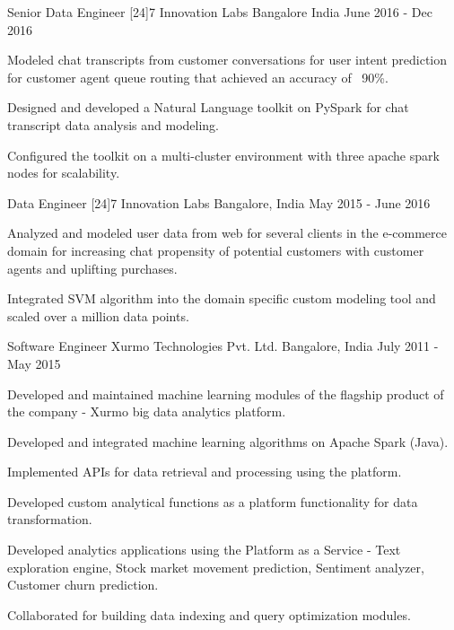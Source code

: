 \begin{cventries}
  \cventry
    {Senior Data Engineer}
    {[24]7 Innovation Labs}
    {Bangalore India}
    {June 2016 - Dec 2016}
    {
      \begin{cvitems}
        \item {Modeled chat transcripts from customer conversations for user intent prediction for customer agent queue routing that achieved an accuracy of ~90\%.}
        \item {Designed and developed a Natural Language toolkit on PySpark for chat transcript data analysis and modeling.}
        \item {Configured the toolkit on a multi-cluster environment with three apache spark nodes for scalability.}
      \end{cvitems}
    }
  \cventry
    {Data Engineer}
    {[24]7 Innovation Labs}
    {Bangalore, India}
    {May 2015 - June 2016}
    {
      \begin{cvitems}
        \item {Analyzed and modeled user data from web for several clients in the e-commerce domain for increasing chat propensity of potential customers with customer agents and uplifting purchases.}
        \item {Integrated SVM algorithm into the domain specific custom modeling tool and scaled over a million data points.}
      \end{cvitems}
    }
  \cventry
    {Software Engineer}
    {Xurmo Technologies Pvt. Ltd.}
    {Bangalore, India}
    {July 2011 - May 2015}
    {
      \begin{cvitems}
        \item {Developed and maintained machine learning modules of the flagship product of the company - Xurmo big data analytics platform.}
        \item {Developed and integrated machine learning algorithms on Apache Spark (Java).}
        \item {Implemented APIs for data retrieval and processing using the platform.}
        \item {Developed custom analytical functions as a platform functionality for data transformation.}
        \item {Developed analytics applications using the Platform as a Service - Text exploration engine, Stock market movement prediction, Sentiment analyzer, Customer churn prediction.}
        \item {Collaborated for building data indexing and query optimization modules.}
      \end{cvitems} 
    }
\end{cventries}
